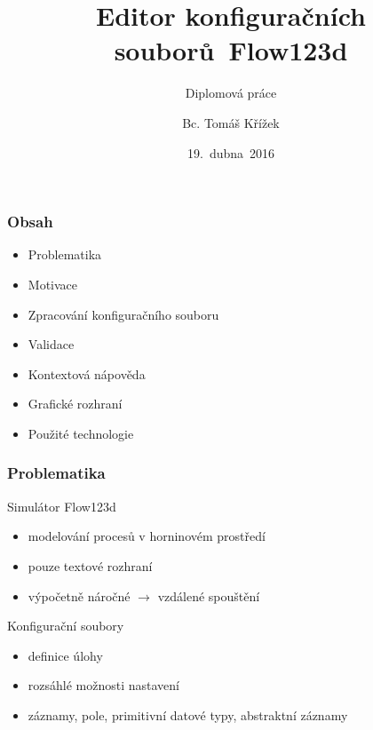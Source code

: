 




\usepackage{palatino}
\usepackage{graphicx}
\usepackage{transparent}


\title[Editor konfiguračních souborů~Flow123d]{Editor konfiguračních souborů~Flow123d}
\subtitle{Diplomová práce}
\author[Bc. Tomáš Křížek]{Bc. Tomáš Křížek}
\date{19.~dubna~2016}
\newcommand{\TextTitulniStranaPodLinkou}{\tiny
Studentská 2 {\color{FM_TUL} |} 461\,17 Liberec 2 {\color{FM_TUL} |} {tomas.krizek1@tul.cz} {\color{FM_TUL} |} 
\href{http://www.fm.tul.cz/}{www.fm.tul.cz}}




\begin{frame}
	\titlepage
\end{frame}

\begin{frame}
	\frametitle{Obsah}
	\begin{itemize}
		\item Problematika
		\item Motivace
		\item Zpracování konfiguračního souboru
		\item Validace
		\item Kontextová nápověda
		\item Grafické rozhraní
		\item Použité technologie
	\end{itemize}
\end{frame}


\begin{frame}[t]
	\frametitle{Problematika}
	\begin{block}{Simulátor Flow123d}
	\begin{itemize}[<+->]
		\item modelování procesů v horninovém prostředí
		\item pouze textové rozhraní
		\item výpočetně náročné $\rightarrow$ vzdálené spouštění
	\end{itemize}
	\end{block}
	
	\begin{block}{Konfigurační soubory}
	\begin{itemize}[<+->]
		\item definice úlohy
		\item rozsáhlé možnosti nastavení
		\item záznamy, pole, primitivní datové typy, abstraktní záznamy
	\end{itemize}
	\end{block}
\end{frame}

